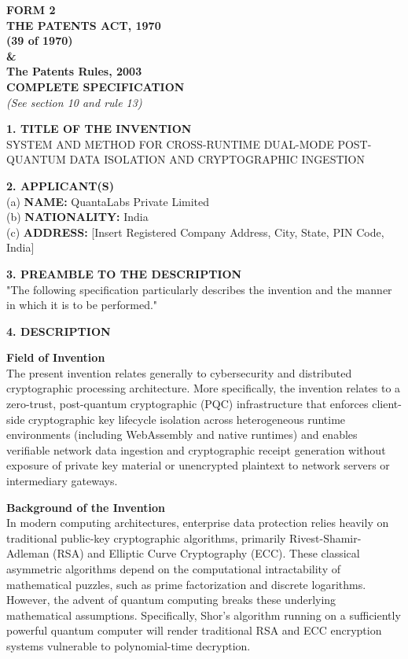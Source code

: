 \documentclass[12pt, a4paper]{article}
\begin{document}
\begin{center}
    \textbf{FORM 2} \\
    \textbf{THE PATENTS ACT, 1970} \\
    \textbf{(39 of 1970)} \\
    \textbf{\&} \\
    \textbf{The Patents Rules, 2003} \\
    \vspace{1em}
    \textbf{COMPLETE SPECIFICATION} \\
    \textit{(See section 10 and rule 13)}
\end{center}

\vspace{1em}
\noindent \textbf{1. TITLE OF THE INVENTION} \\
SYSTEM AND METHOD FOR CROSS-RUNTIME DUAL-MODE POST-QUANTUM DATA ISOLATION AND CRYPTOGRAPHIC INGESTION

\vspace{1em}
\noindent \textbf{2. APPLICANT(S)} \\
(a) \textbf{NAME:} QuantaLabs Private Limited \\
(b) \textbf{NATIONALITY:} India \\
(c) \textbf{ADDRESS:} [Insert Registered Company Address, City, State, PIN Code, India]

\vspace{1em}
\noindent \textbf{3. PREAMBLE TO THE DESCRIPTION} \\
"The following specification particularly describes the invention and the manner in which it is to be performed."

\newpage
\noindent \textbf{4. DESCRIPTION}

\vspace{1em}
\noindent \textbf{Field of Invention} \\
The present invention relates generally to cybersecurity and distributed cryptographic processing architecture. More specifically, the invention relates to a zero-trust, post-quantum cryptographic (PQC) infrastructure that enforces client-side cryptographic key lifecycle isolation across heterogeneous runtime environments (including WebAssembly and native runtimes) and enables verifiable network data ingestion and cryptographic receipt generation without exposure of private key material or unencrypted plaintext to network servers or intermediary gateways.

\vspace{1em}
\noindent \textbf{Background of the Invention} \\
In modern computing architectures, enterprise data protection relies heavily on traditional public-key cryptographic algorithms, primarily Rivest-Shamir-Adleman (RSA) and Elliptic Curve Cryptography (ECC). These classical asymmetric algorithms depend on the computational intractability of mathematical puzzles, such as prime factorization and discrete logarithms. However, the advent of quantum computing breaks these underlying mathematical assumptions. Specifically, Shor’s algorithm running on a sufficiently powerful quantum computer will render traditional RSA and ECC encryption systems vulnerable to polynomial-time decryption.
\end{document}
